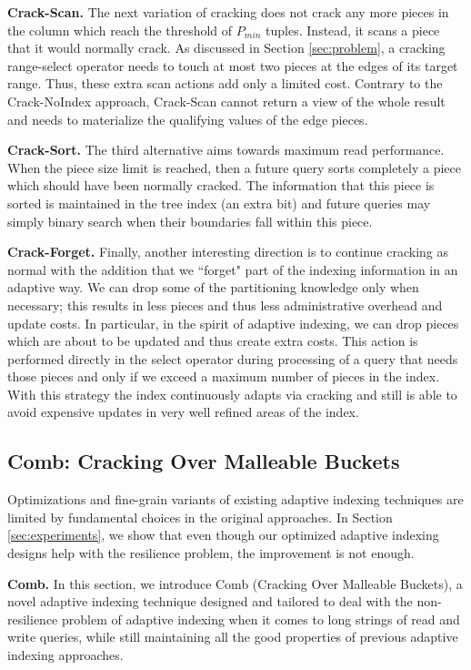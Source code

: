 \textbf{Crack-Scan.} The next variation of cracking does not crack any more pieces 
in the column which reach  the threshold of $P_{min}$ tuples.
Instead, it scans a piece that it would normally crack.
As discussed in Section \ref{sec:problem}, a cracking range-select operator 
needs to touch at most two pieces at the edges of its target range. 
Thus, these extra scan actions add only a limited cost.
Contrary to the Crack-NoIndex approach,
Crack-Scan cannot return a view of the whole result and needs to materialize the qualifying values of the edge pieces.

\textbf{Crack-Sort.} The third alternative aims towards maximum read performance. 
When the piece size limit is reached, then a future query sorts completely a piece which should have been normally cracked.
The information that this piece is sorted is maintained in the tree index (an extra bit)
and future queries may simply binary search when their boundaries fall within this piece.

\textbf{Crack-Forget.} Finally, another interesting direction is to continue cracking as normal
with the addition that we ``forget" part of the indexing information in an adaptive way.
We can drop some of the partitioning knowledge only when necessary; this results in less pieces and thus less 
administrative overhead and update costs. In particular, in the spirit of adaptive indexing, 
we can drop pieces which are about to be updated and thus create extra costs.
This action is performed directly in the select operator during processing of a query that needs those pieces
and only if we exceed a maximum number of pieces in the index. With this strategy the index continuously adapts 
via cracking and still is able to avoid expensive updates in very well refined areas of the index.


\subsection{Comb: Cracking Over Malleable Buckets}
Optimizations and fine-grain variants of existing adaptive indexing techniques are limited
by fundamental choices in the original approaches. 
In Section \ref{sec:experiments}, we show that even though our optimized adaptive indexing designs
help with the resilience problem, the improvement is not enough.

\textbf{Comb.}
In this section, we introduce Comb (Cracking Over Malleable Buckets),
a novel adaptive indexing technique designed and tailored
to deal with the non-resilience problem of adaptive indexing when it comes to long strings of read and write queries,
while still maintaining all the good properties of previous adaptive indexing approaches.



